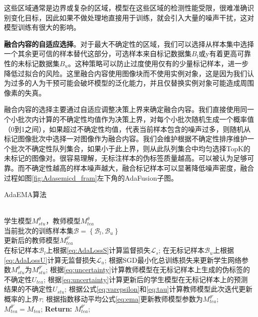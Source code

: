 \documentclass[lang=chs, degree=master, blindreview=false, adobe=false]{yanputhesis}
\begin{document}
这些区域通常是边界或复杂的区域，模型在这些区域的检测性能受限，很难准确识别变化目标，因此如果不做处理地直接用于训练，就会引入大量的噪声干扰，这对模型训练有很大的影响。

\textbf{融合内容的自适应选择}。对于最大不确定性的区域，我们可以选择从样本集中选择一个其余更可信的样本替代这部分，可选样本来自标记数据集$B_l$或y有着更高可靠性的未标记数据集$B_u$。这种策略可以防止过度使用仅有的少量标记样本，进一步降低过拟合的风险。这里融合内容使用图像块而不使用实例对象，这是因为我们认为过多的人为干预可能会破坏模型的泛化能力，并且仅替换实例对象可能造成周围像素的失真。

融合内容的选择主要通过自适应调整决策上界来确定融合内容。我们直接使用同一个小批次内计算的不确定性均值作为决策上界，对每个小批次随机生成一个概率值（0到1之间），如果超过不确定性均值，代表当前样本包含的噪声过多，则随机从标记图像批次中选择一对图像作为融合内容。我们会维护根据不确定性排序维护一个批次不确定性队列集合，如果小于此上界，则从此队列集合中均匀选择TopK的未标记的图像对。很容易理解，无标注样本的伪标签质量越高。可以被认为足够可靠。而不确定性越高的样本噪声越大，融合标记样本可以显著降低噪声密度，融合过程如图\ref{fig:Adasemicd_fram}左下角的AdaFusion子图。
\begin{algorithm}[!htbp]
  \caption{AdaEMA算法}
  \label{alg:AdaEMA}
  \begin{algorithmic}[1] %
  \Require ~~\\
    学生模型$M_{stu}^{\theta}$，教师模型$M_{tea}^{\theta}$ \\
    当前批次的训练样本集$\mathcal{B} = \left \{\mathcal{B}_l, \mathcal{B}_u\right \}$
  \Ensure ~~\\
    更新后的教师模型$M_{tea}^{\theta'}$ \\
  \State 在标记样本$\mathcal{B}_l$上根据\ref{eq:AdaLossS}计算监督损失$\mathcal{L}_{s}$;
  \State 在无标记样本$\mathcal{B}_u$上根据\ref{eq:AdaLossU}计算无监督损失$\mathcal{L}_{u}$;
  \State 根据SGD最小化总训练损失来更新学生网络参数$M_{stu}^{\theta}$为$M_{stu}^{\theta'}$;
  \State 根据\ref{eq:uncertainty}计算教师模型在无标记样本上生成的伪标签的不确定性${U}_{tea}$;
  \State 根据\ref{eq:uncertainty}计算更新后的学生模型在无标记样本上的预测结果的不确定性${U}_{stu}$;
  \State 根据公式\ref{eq:varepsilon}和\ref{eq:tau}计算教师模型此次迭代更新概率的上界$\tau$;
    \State 根据指数移动平均公式\ref{eq:ema}更新教师模型参数为$M_{tea}^{\theta'}$;
  \Else
    \State $M_{tea}^{\theta'} = M_{tea}$;
  \EndIf
  \State \textbf{Return:} $M_{tea}^{\theta'}$;
  \end{algorithmic}
\end{algorithm}
\end{document}
